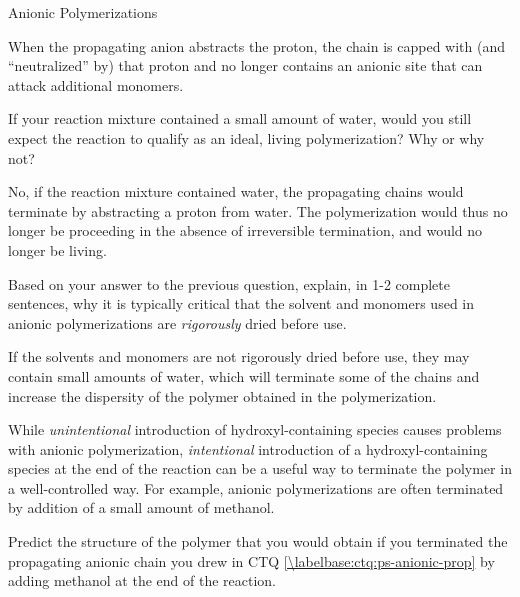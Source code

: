 \begin{activity}{Anionic Polymerizations}
\begin{ctqs}
		\begin{solution}[1in]
			When the propagating anion abstracts the proton, the chain is capped with (and ``neutralized'' by) that proton and no longer contains an anionic site that can attack additional monomers.
		\end{solution}
	
	\question If your reaction mixture contained a small amount of water, would you still expect the reaction to qualify as an ideal, living polymerization?  Why or why not?
	
		\begin{solution}[1.25in]
			No, if the reaction mixture contained water, the propagating chains would terminate by abstracting a proton from water.  The polymerization would thus no longer be proceeding in the absence of irreversible termination, and would no longer be living.
		\end{solution}
	
	\question Based on your answer to the previous question, explain, in 1-2 complete sentences, why it is typically critical that the solvent and monomers used in anionic polymerizations are \emph{rigorously} dried before use.
	
		\begin{solution}[1.25in]
			If the solvents and monomers are not rigorously dried before use, they may contain small amounts of water, which will terminate some of the chains and increase the dispersity of the polymer obtained in the polymerization.
		\end{solution}
	
\end{ctqs}

\begin{infobox}

	While \emph{unintentional} introduction of hydroxyl-containing species causes problems with anionic polymerization, \emph{intentional} introduction of a hydroxyl-containing species at the end of the reaction can be a useful way to terminate the polymer in a well-controlled way.  For example, anionic polymerizations are often terminated by addition of a small amount of methanol.

\end{infobox}

\begin{ctqs}

	\question Predict the structure of the polymer that you would obtain if you terminated the propagating anionic chain you drew in CTQ \ref{\labelbase:ctq:ps-anionic-prop} by adding methanol at the end of the reaction.
	

\end{ctqs}
\end{activity}
